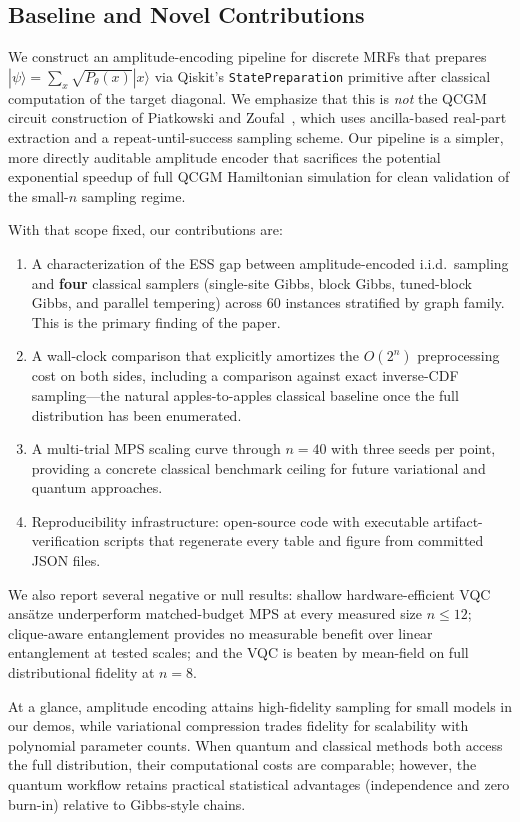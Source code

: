 \documentclass[conference,10pt]{IEEEtran}
\begin{document}
\subsection{Baseline and Novel Contributions}

We construct an amplitude-encoding pipeline for discrete MRFs that prepares $|\psi\rangle = \sum_x \sqrt{P_\theta(x)}|x\rangle$ via Qiskit's \texttt{StatePreparation} primitive after classical computation of the target diagonal. We emphasize that this is \emph{not} the QCGM circuit construction of Piatkowski and Zoufal~\cite{piatkowski2024qcgms}, which uses ancilla-based real-part extraction and a repeat-until-success sampling scheme. Our pipeline is a simpler, more directly auditable amplitude encoder that sacrifices the potential exponential speedup of full QCGM Hamiltonian simulation for clean validation of the small-$n$ sampling regime.

With that scope fixed, our contributions are:
\begin{enumerate}[leftmargin=*]
    \item A characterization of the ESS gap between amplitude-encoded i.i.d.\ sampling and \textbf{four} classical samplers (single-site Gibbs, block Gibbs, tuned-block Gibbs, and parallel tempering) across 60 instances stratified by graph family. This is the primary finding of the paper.
    \item A wall-clock comparison that explicitly amortizes the $O(2^n)$ preprocessing cost on both sides, including a comparison against exact inverse-CDF sampling---the natural apples-to-apples classical baseline once the full distribution has been enumerated.
    \item A multi-trial MPS scaling curve through $n=40$ with three seeds per point, providing a concrete classical benchmark ceiling for future variational and quantum approaches.
    \item Reproducibility infrastructure: open-source code with executable artifact-verification scripts that regenerate every table and figure from committed JSON files.
\end{enumerate}
We also report several negative or null results: shallow hardware-efficient VQC ans\"atze underperform matched-budget MPS at every measured size $n \le 12$; clique-aware entanglement provides no measurable benefit over linear entanglement at tested scales; and the VQC is beaten by mean-field on full distributional fidelity at $n=8$.

At a glance, amplitude encoding attains high-fidelity sampling for small models in our demos, while variational compression trades fidelity for scalability with polynomial parameter counts. When quantum and classical methods both access the full distribution, their computational costs are comparable; however, the quantum workflow retains practical statistical advantages (independence and zero burn-in) relative to Gibbs-style chains.
\end{document}
